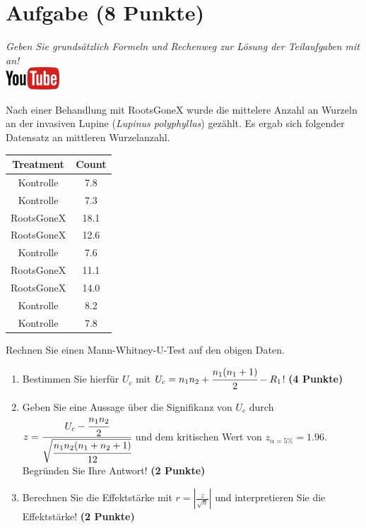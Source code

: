 \documentclass[a4paper, 10pt]{scrartcl}\usepackage[]{graphicx}\usepackage[]{xcolor}
\newenvironment{knitrout}{}{} %
\begin{document}
\section{Aufgabe \hfill (8 Punkte)}

\textit{Geben Sie grunds{\"a}tzlich Formeln und Rechenweg zur L{\"o}sung der
  Teilaufgaben mit an!} \\[1Ex]

\hfill\href{https://youtu.be/5tiJFxuZcco}{\includegraphics[width =
  2cm]{img/youtube}} %
\hspace{2Ex}




Nach einer Behandlung mit RootsGoneX wurde die mittelere Anzahl an Wurzeln
an der invasiven Lupine (\textit{Lupinus polyphyllus}) gez{\"a}hlt. Es ergab sich
folgender Datensatz an mittleren Wurzelanzahl.

\begin{knitrout}
\color{fgcolor}\begin{table}[!h]
\centering
\begin{tabular}{cc}
\toprule
Treatment & Count\\
\midrule
Kontrolle & 7.8\\
Kontrolle & 7.3\\
RootsGoneX & 18.1\\
RootsGoneX & 12.6\\
Kontrolle & 7.6\\
\addlinespace
RootsGoneX & 11.1\\
RootsGoneX & 14.0\\
Kontrolle & 8.2\\
Kontrolle & 7.8\\
\bottomrule
\end{tabular}
\end{table}

\end{knitrout}

Rechnen Sie einen Mann-Whitney-U-Test auf den obigen Daten.

\begin{enumerate}
\item Bestimmen Sie hierf{\"u}r $U_c$ mit $U_c = n_1n_2 +
  \cfrac{n_1(n_1+1)}{2}-R_1$! \textbf{(4 Punkte)} 
\item Geben Sie eine Aussage {\"u}ber die Signifikanz von $U_c$ durch
  $z = \cfrac{U_c -
    \cfrac{n_1n_2}{2}}{\sqrt{\cfrac{n_1n_2(n_1+n_2+1)}{12}}}$ und dem
  kritischen Wert von $z_{\alpha = 5\%} = 1.96$. Begr{\"u}nden Sie Ihre
  Antwort! \textbf{(2 Punkte)}
\item Berechnen Sie die Effektst{\"a}rke mit $r = |\frac{z}{\sqrt{n}}| $ und
  interpretieren Sie die Effektst{\"a}rke! \textbf{(2 Punkte)} 
\end{enumerate} 
\clearpage
\end{document}
